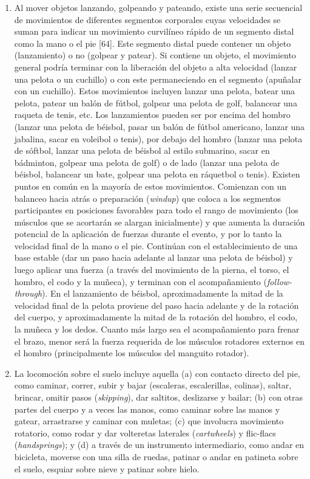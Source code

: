 \documentclass[12pt]{book}
\begin{document}
\begin{enumerate}
    \item[2.] Al mover objetos lanzando, golpeando y pateando, existe una serie secuencial de movimientos de diferentes segmentos corporales cuyas velocidades se suman para indicar un movimiento curvilíneo rápido de un segmento distal como la mano o el pie [64]. Este segmento distal puede contener un objeto (lanzamiento) o no (golpear y patear). Si contiene un objeto, el movimiento general podría terminar con la liberación del objeto a alta velocidad (lanzar una pelota o un cuchillo) o con este permaneciendo en el segmento (apuñalar con un cuchillo). Estos movimientos incluyen lanzar una pelota, batear una pelota, patear un balón de fútbol, golpear una pelota de golf, balancear una raqueta de tenis, etc. Los lanzamientos pueden ser por encima del hombro (lanzar una pelota de béisbol, pasar un balón de fútbol americano, lanzar una jabalina, sacar en voleibol o tenis), por debajo del hombro (lanzar una pelota de sóftbol, lanzar una pelota de béisbol al estilo submarino, sacar en bádminton, golpear una pelota de golf) o de lado (lanzar una pelota de béisbol, balancear un bate, golpear una pelota en ráquetbol o tenis). Existen puntos en común en la mayoría de estos movimientos. Comienzan con un balanceo hacia atrás o preparación (\textit{windup}) que coloca a los segmentos participantes en posiciones favorables para todo el rango de movimiento (los músculos que se acortarán se alargan inicialmente) y que aumenta la duración potencial de la aplicación de fuerzas durante el evento, y por lo tanto la velocidad final de la mano o el pie. Continúan con el establecimiento de una base estable (dar un paso hacia adelante al lanzar una pelota de béisbol) y luego aplicar una fuerza (a través del movimiento de la pierna, el torso, el hombro, el codo y la muñeca), y terminan con el acompañamiento (\textit{follow-through}). En el lanzamiento de béisbol, aproximadamente la mitad de la velocidad final de la pelota proviene del paso hacia adelante y de la rotación del cuerpo, y aproximadamente la mitad de la rotación del hombro, el codo, la muñeca y los dedos. Cuanto más largo sea el acompañamiento para frenar el brazo, menor será la fuerza requerida de los músculos rotadores externos en el hombro (principalmente los músculos del manguito rotador).
    
    \item[3.] La locomoción sobre el suelo incluye aquella (a) con contacto directo del pie, como caminar, correr, subir y bajar (escaleras, escalerillas, colinas), saltar, brincar, omitir pasos (\textit{skipping}), dar saltitos, deslizarse y bailar; (b) con otras partes del cuerpo y a veces las manos, como caminar sobre las manos y gatear, arrastrarse y caminar con muletas; (c) que involucra movimiento rotatorio, como rodar y dar volteretas laterales (\textit{cartwheels}) y flic-flacs (\textit{handsprings}); y (d) a través de un instrumento intermediario, como andar en bicicleta, moverse con una silla de ruedas, patinar o andar en patineta sobre el suelo, esquiar sobre nieve y patinar sobre hielo.
    

\end{enumerate}
\end{document}
